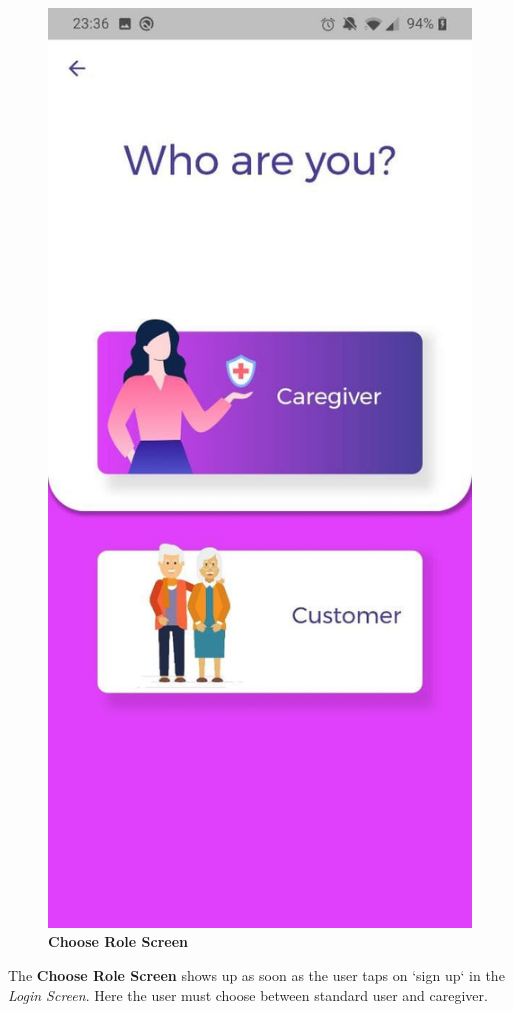 \documentclass[../../dd.tex]{subfiles}
\begin{document}
    \begin{figure}[H]
        \centering
        \includegraphics[height=.6\textheight]{../../assets/screens/role.jpg}
        \caption{\textbf{Choose Role Screen}}\label{fig:figure}
    \end{figure}
    \begin{center}
        The \textbf{Choose Role Screen} shows up as soon as the user taps on `sign up` in the \textit{Login Screen}.
        Here the user must choose between standard user and caregiver.
    \end{center}
\end{document}
